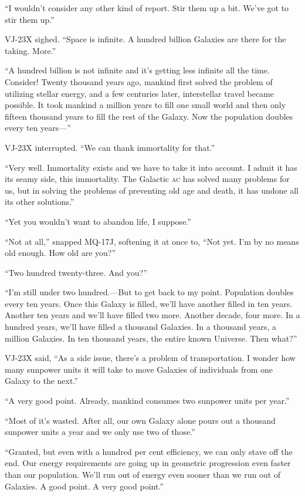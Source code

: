 \enquote{I wouldn't consider any other kind of report. Stir them up a bit. We've got to stir them up.}

VJ-23X sighed. \enquote{Space is infinite. A hundred billion Galaxies are there for the taking. More.}

\enquote{A hundred billion is not infinite and it's getting less infinite all the time. Consider! Twenty thousand years ago, mankind first solved the problem of utilizing stellar energy, and a few centuries later, interstellar travel became possible. It took mankind a million years to fill one small world and then only fifteen thousand years to fill the rest of the Galaxy. Now the population doubles every ten years---}

VJ-23X interrupted. \enquote{We can thank immortality for that.}

\enquote{Very well. Immortality exists and we have to take it into account. I admit it has its seamy side, this immortality. The Galactic \textsc{ac} has solved many problems for us, but in solving the problems of preventing old age and death, it has undone all its other solutions.}

\enquote{Yet you wouldn't want to abandon life, I suppose.}

\enquote{Not at all,} snapped MQ-17J, softening it at once to, \enquote{Not yet. I'm by no means old enough. How old are you?}

\enquote{Two hundred twenty-three. And you?}

\enquote{I'm still under two hundred.---But to get back to my point. Population doubles every ten years. Once this Galaxy is filled, we'll have another filled in ten years. Another ten years and we'll have filled two more. Another decade, four more. In a hundred years, we'll have filled a thousand Galaxies. In a thousand years, a million Galaxies. In ten thousand years, the entire known Universe. Then what?}

VJ-23X said, \enquote{As a side issue, there's a problem of transportation. I wonder how many sunpower units it will take to move Galaxies of individuals from one Galaxy to the next.}

\enquote{A very good point. Already, mankind consumes two sunpower units per year.}

\enquote{Most of it's wasted. After all, our own Galaxy alone pours out a thousand sunpower units a year and we only use two of those.}

\enquote{Granted, but even with a hundred per cent efficiency, we can only stave off the end. Our energy requirements are going up in geometric progression even faster than our population. We'll run out of energy even sooner than we run out of Galaxies. A good point. A very good point.}

